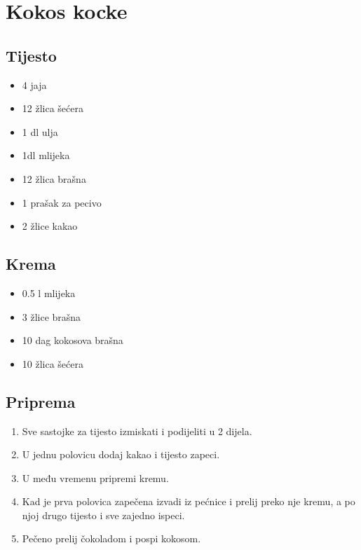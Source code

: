 \documentclass{article}
\begin{document}
\section{Kokos kocke}
\subsection{Tijesto}
\begin{itemize}
  \item 4 jaja
  \item 12 žlica šećera
  \item 1 dl ulja
  \item 1dl mlijeka
  \item 12 žlica brašna
  \item 1 prašak za pecivo
  \item 2 žlice kakao
\end{itemize}

\subsection{Krema}
\begin{itemize}
  \item 0.5 l mlijeka
  \item 3 žlice brašna
  \item 10 dag kokosova brašna
  \item 10 žlica šećera
\end{itemize}

\subsection{Priprema}
\begin{enumerate}
  \item Sve sastojke za tijesto izmiskati i podijeliti u 2 dijela.
  \item U jednu polovicu dodaj kakao i tijesto zapeci.
  \item U među vremenu pripremi kremu.
  \item Kad je prva polovica zapečena izvadi iz pećnice i prelij preko nje kremu, a po njoj drugo tijesto i sve zajedno ispeci.
  \item Pečeno prelij čokoladom i pospi kokosom.
\end{enumerate}
\end{document}
